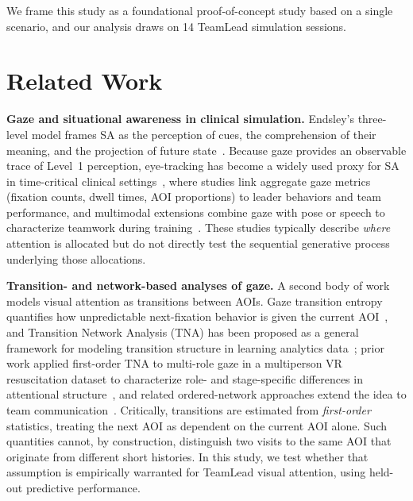 \documentclass[runningheads]{llncs}
\begin{document}
We frame this study as a foundational proof-of-concept study based on a single scenario, and our analysis draws on 14 TeamLead simulation sessions.

\section{Related Work}

\textbf{Gaze and situational awareness in clinical simulation.}
Endsley's three-level model frames SA as the perception of cues, the comprehension of their meaning, and the projection of future state~\cite{ensley1995toward}. Because gaze provides an observable trace of Level~1 perception, eye-tracking has become a widely used proxy for SA in time-critical clinical settings~\cite{caloca2024exploring,weinberg2020visual}, where studies link aggregate gaze metrics (fixation counts, dwell times, AOI proportions) to leader behaviors and team performance, and multimodal extensions combine gaze with pose or speech to characterize teamwork during training~\cite{rosen2015integrative,popov2025communication}. These studies typically describe \emph{where} attention is allocated but do not directly test the sequential generative process underlying those allocations.

\textbf{Transition- and network-based analyses of gaze.}
A second body of work models visual attention as transitions between AOIs. Gaze transition entropy quantifies how unpredictable next-fixation behavior is given the current AOI~\cite{krejtz2015gaze}, and Transition Network Analysis (TNA) has been proposed as a general framework for modeling transition structure in learning analytics data~\cite{saqr2025transition}; prior work applied first-order TNA to multi-role gaze in a multiperson VR resuscitation dataset to characterize role- and stage-specific differences in attentional structure~\cite{gao2026towards}, and related ordered-network approaches extend the idea to team communication~\cite{popov2025communication}. Critically, transitions are estimated from \emph{first-order} statistics, treating the next AOI as dependent on the current AOI alone. Such quantities cannot, by construction, distinguish two visits to the same AOI that originate from different short histories. In this study, we test whether that assumption is empirically warranted for TeamLead visual attention, using held-out predictive performance.
\end{document}
